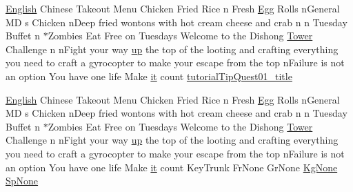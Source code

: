 \begin{DoxyCompactItemize}
\item 
\mbox{\hyperlink{_sphere_i_i_01_winter_01_project_2_config_2_localization_8txt_ad896b63205779b1b09e86d941ce13976}{English}} Chinese Takeout Menu Chicken Fried Rice n Fresh \mbox{\hyperlink{_sphere_i_i_01_winter_01_project_2_config_2_localization_8txt_a55334ab0b48a68a93004334728020f15}{Egg}} Rolls n\+General MD s Chicken n\+Deep fried wontons with hot cream cheese and crab n n Tuesday Buffet n $\ast$Zombies Eat Free on Tuesdays Welcome to the Dishong \mbox{\hyperlink{_dishong_01_tower_01_challenge_2_config_2_localization_8txt_ad03a7286db82f171f8e82a1eaf4e3eaf}{Tower}} Challenge n n\+Fight your way \mbox{\hyperlink{_the_01_restless_01_curse_2_config_2_localization_01-_01_quest_8txt_a2f8d5a9cc6c08e259de10d34d28f85c4}{up}} the top of the looting and crafting everything you need to craft a gyrocopter to make your escape from the top n\+Failure is not an option You have one life Make \mbox{\hyperlink{_the_01_restless_01_curse_2_config_2_localization_01-_01_quest_8txt_a741b285909bea4855b886664c2dcd50c}{it}} count \mbox{\hyperlink{_dishong_01_tower_01_challenge_2_config_2_localization_8txt_a310857bad9c20b1fad8f32ef58eff69d}{tutorial\+Tip\+Quest01\+\_\+title}}
\item 
\mbox{\hyperlink{_sphere_i_i_01_winter_01_project_2_config_2_localization_8txt_ad896b63205779b1b09e86d941ce13976}{English}} Chinese Takeout Menu Chicken Fried Rice n Fresh \mbox{\hyperlink{_sphere_i_i_01_winter_01_project_2_config_2_localization_8txt_a55334ab0b48a68a93004334728020f15}{Egg}} Rolls n\+General MD s Chicken n\+Deep fried wontons with hot cream cheese and crab n n Tuesday Buffet n $\ast$Zombies Eat Free on Tuesdays Welcome to the Dishong \mbox{\hyperlink{_dishong_01_tower_01_challenge_2_config_2_localization_8txt_ad03a7286db82f171f8e82a1eaf4e3eaf}{Tower}} Challenge n n\+Fight your way \mbox{\hyperlink{_the_01_restless_01_curse_2_config_2_localization_01-_01_quest_8txt_a2f8d5a9cc6c08e259de10d34d28f85c4}{up}} the top of the looting and crafting everything you need to craft a gyrocopter to make your escape from the top n\+Failure is not an option You have one life Make \mbox{\hyperlink{_the_01_restless_01_curse_2_config_2_localization_01-_01_quest_8txt_a741b285909bea4855b886664c2dcd50c}{it}} count Key\+Trunk Fr\+None Gr\+None \mbox{\hyperlink{_the_01_restless_01_curse_2_config_2_localization_8txt_acc1c43e0980c5828bcfaf85313744919}{Kg\+None}} \mbox{\hyperlink{_dishong_01_tower_01_challenge_2_config_2_localization_8txt_a930563c0fe6b185de309592c402a9c60}{Sp\+None}}
\item 

\end{DoxyCompactItemize}
